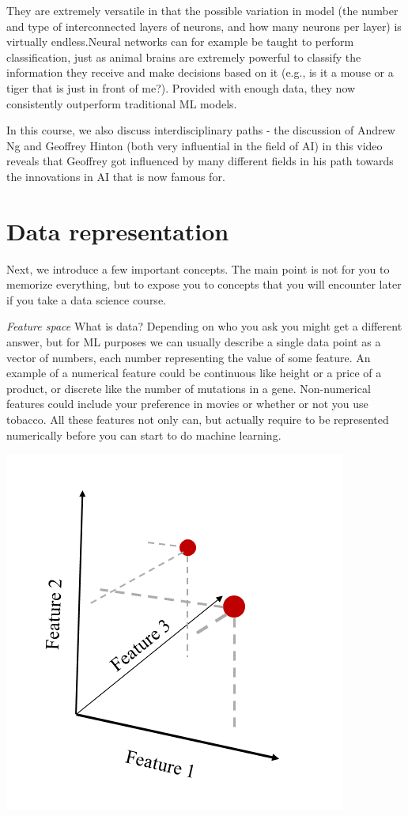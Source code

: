 \documentclass[
]{book}
\begin{document}
They are extremely versatile in that the possible variation in model (the number and type of interconnected layers of neurons, and how many neurons per layer) is virtually endless.Neural networks can for example be taught to perform classification, just as animal brains are extremely powerful to classify the information they receive and make decisions based on it (e.g., is it a mouse or a tiger that is just in front of me?). Provided with enough data, they now consistently outperform traditional ML models.

In this course, we also discuss interdisciplinary paths - the discussion of Andrew Ng and Geoffrey Hinton (both very influential in the field of AI) in this video reveals that Geoffrey got influenced by many different fields in his path towards the innovations in AI that is now famous for.

\hypertarget{data-representation}{%
\section{Data representation}\label{data-representation}}

Next, we introduce a few important concepts. The main point is not for you to memorize everything, but to expose you to concepts that you will encounter later if you take a data science course.

\emph{Feature space} What is data? Depending on who you ask you might get a different answer, but for ML purposes we can usually describe a single data point as a vector of numbers, each number representing the value of some feature. An example of a numerical feature could be continuous like height or a price of a product, or discrete like the number of mutations in a gene. Non-numerical features could include your preference in movies or whether or not you use tobacco. All these features not only can, but actually require to be represented numerically before you can start to do machine learning.

\includegraphics{assets/feature_space.png}
\end{document}
